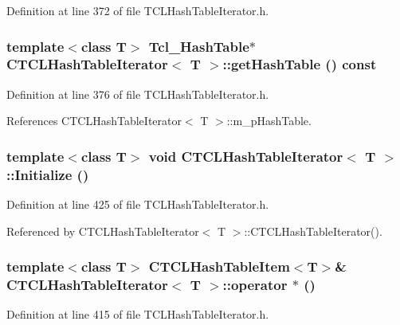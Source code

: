 Definition at line 372 of file TCLHash\-Table\-Iterator.h.
\subsubsection{\setlength{\rightskip}{0pt plus 5cm}template$<$class T$>$ Tcl\_\-Hash\-Table$\ast$ CTCLHash\-Table\-Iterator$<$ T $>$::get\-Hash\-Table () const\hspace{0.3cm}{\tt  [inline]}}\label{classCTCLHashTableIterator_a7}




Definition at line 376 of file TCLHash\-Table\-Iterator.h.

References CTCLHash\-Table\-Iterator$<$ T $>$::m\_\-p\-Hash\-Table.
\subsubsection{\setlength{\rightskip}{0pt plus 5cm}template$<$class T$>$ void CTCLHash\-Table\-Iterator$<$ T $>$::Initialize ()\hspace{0.3cm}{\tt  [inline, protected]}}\label{classCTCLHashTableIterator_b0}




Definition at line 425 of file TCLHash\-Table\-Iterator.h.

Referenced by CTCLHash\-Table\-Iterator$<$ T $>$::CTCLHash\-Table\-Iterator().
\subsubsection{\setlength{\rightskip}{0pt plus 5cm}template$<$class T$>$ {\bf CTCLHash\-Table\-Item}$<$T$>$\& CTCLHash\-Table\-Iterator$<$ T $>$::operator $\ast$ ()\hspace{0.3cm}{\tt  [inline]}}\label{classCTCLHashTableIterator_a13}




Definition at line 415 of file TCLHash\-Table\-Iterator.h.

